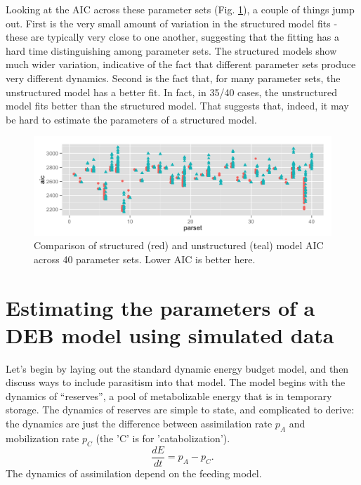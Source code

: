 \documentclass[12pt,reqno,final,pdftex]{amsart}\usepackage[]{graphicx}\usepackage[]{color}
\newenvironment{knitrout}{}{} %
\theoremstyle{plain}
\numberwithin{equation}{part}
\begin{document}
Looking at the AIC across these parameter sets (Fig. \ref{fig:aiccomp}), a couple of things jump out.
First is the very small amount of variation in the structured model fits - these are typically very close to one another, suggesting that the fitting has a hard time distinguishing among parameter sets.
The structured models show much wider variation, indicative of the fact that different parameter sets produce very different dynamics.
Second is the fact that, for many parameter sets, the unstructured model has a better fit. In fact, in 35/40 cases, the unstructured model fits better than the structured model.
That suggests that, indeed, it may be hard to estimate the parameters of a structured model.
\begin{knitrout}\scriptsize
{}\color{fgcolor}\begin{figure}

\includegraphics[width=\linewidth]{figure/aiccomp-1} \hfill{}

\caption[Comparison of structured (red) and unstructured (teal) model AIC across 40 parameter sets]{Comparison of structured (red) and unstructured (teal) model AIC across 40 parameter sets. Lower AIC is better here.}\label{fig:aiccomp}
\end{figure}


\end{knitrout}


\clearpage

\section*{Estimating the parameters of a DEB model using simulated data}

Let's begin by laying out the standard dynamic energy budget model, and then discuss ways to include parasitism into that model.
The model begins with the dynamics of ``reserves'', a pool of metabolizable energy that is in temporary storage.
The dynamics of reserves are simple to state, and complicated to derive: the dynamics are just the difference between assimilation rate $p_A$ and mobilization rate $p_C$ (the 'C' is for 'catabolization').
\begin{equation}
\frac{dE}{dt} = p_A - p_C.
\end{equation}
The dynamics of assimilation depend on the feeding model.
\end{document}

